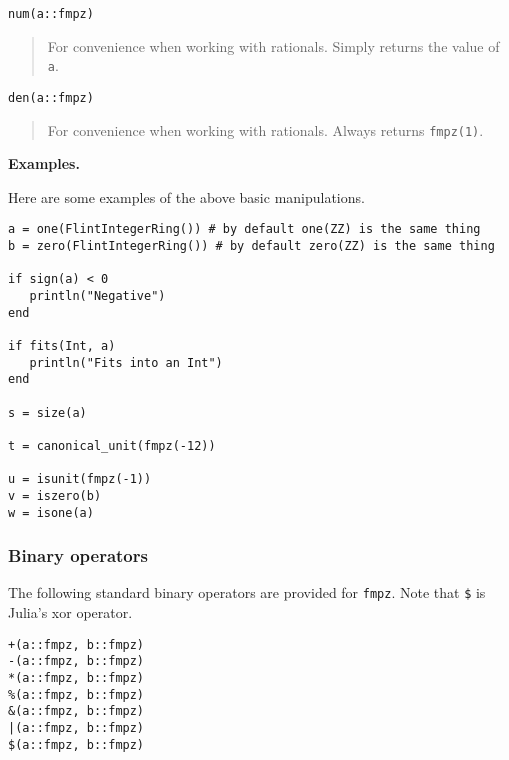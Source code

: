 \documentclass[a4paper,10pt]{article}
\newcommand{\code}{\lstinline}
\newcommand{\desc}[1]{\vspace{-3mm}\begin{quote}#1\end{quote}}
\begin{document}
\begin{lstlisting}
num(a::fmpz)
\end{lstlisting}

\desc{For convenience when working with rationals. Simply returns the value of \code{a}.}

\begin{lstlisting}
den(a::fmpz)
\end{lstlisting}

\desc{For convenience when working with rationals. Always returns \code{fmpz(1)}.}

\textbf{Examples.}

Here are some examples of the above basic manipulations.

\begin{lstlisting}
a = one(FlintIntegerRing()) # by default one(ZZ) is the same thing 
b = zero(FlintIntegerRing()) # by default zero(ZZ) is the same thing 

if sign(a) < 0
   println("Negative")
end

if fits(Int, a)
   println("Fits into an Int")
end

s = size(a)

t = canonical_unit(fmpz(-12))

u = isunit(fmpz(-1))
v = iszero(b)
w = isone(a)
\end{lstlisting}

\subsubsection{Binary operators}

The following standard binary operators are provided for \code{fmpz}. Note that \code{$} is Julia's
xor operator.

\begin{lstlisting}
+(a::fmpz, b::fmpz)
-(a::fmpz, b::fmpz)
*(a::fmpz, b::fmpz)
%(a::fmpz, b::fmpz)
&(a::fmpz, b::fmpz)
|(a::fmpz, b::fmpz)
$(a::fmpz, b::fmpz)
\end{lstlisting}
\end{document}
